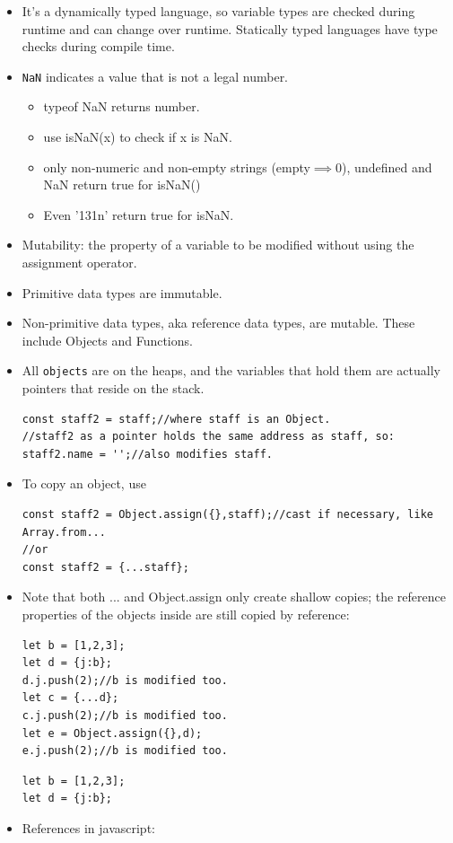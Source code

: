 \documentclass{report}
\begin{document}
\begin{itemize}
\item It's a dynamically typed language, so variable types are checked during runtime and can change over runtime. Statically typed languages have type checks during compile time.
\item \texttt{NaN} indicates a value that is not a legal number.
\begin{itemize}
    \item typeof NaN returns number.
    \item use isNaN(x) to check if x is NaN.
    \item only non-numeric and non-empty strings (empty$\implies$0), undefined and NaN return true for isNaN()
    \item Even '131n' return true for isNaN.
\end{itemize}
\item Mutability: the property of a variable to be modified without using the assignment operator.
\item Primitive data types are immutable.
\item Non-primitive data types, aka reference data types, are mutable. These include Objects and Functions.
\item All \texttt{objects} are on the heaps, and the variables that hold them are actually pointers that reside on the stack.
\begin{lstlisting}
const staff2 = staff;//where staff is an Object.
//staff2 as a pointer holds the same address as staff, so:
staff2.name = '';//also modifies staff.
\end{lstlisting}
\item To copy an object, use
\begin{lstlisting}
const staff2 = Object.assign({},staff);//cast if necessary, like Array.from...
//or
const staff2 = {...staff};
\end{lstlisting}
\item Note that both ... and Object.assign only create shallow copies; the reference properties of the objects inside are still copied by reference:
\begin{lstlisting}
let b = [1,2,3];
let d = {j:b};
d.j.push(2);//b is modified too.
let c = {...d};
c.j.push(2);//b is modified too.
let e = Object.assign({},d);
e.j.push(2);//b is modified too.
\end{lstlisting}
\begin{lstlisting}
let b = [1,2,3];
let d = {j:b};
\end{lstlisting}
\item References in javascript:

\end{itemize}
\end{document}
